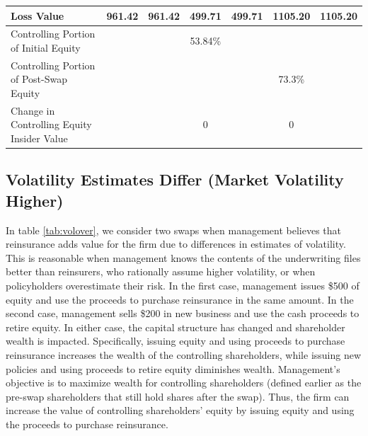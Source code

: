 \begin{table}
\begin{center}
\begin{tabular}{p{2in}cccccc}
Loss Value & 961.42 &   961.42 &   499.71 &   499.71 &   1105.20 &   1105.20 \\
\midrule

Controlling Portion of Initial Equity &            &            &   53.84\% &            &            &            \\

Controlling Portion of Post-Swap Equity &            &            &            &            &   73.3\% &            \\

\midrule
Change in Controlling Equity Insider Value &            &            &          0 &            &          0 &            \\
\bottomrule
\end{tabular}  
\end{center}
\end{table}

\subsection{Volatility Estimates Differ (Market Volatility Higher)}

In table \ref{tab:volover}, we consider two swaps when management believes that reinsurance adds value for the firm due to differences in estimates of volatility.  This is reasonable when management knows the contents of the underwriting files better than reinsurers, who rationally assume higher volatility, or when policyholders overestimate their risk. In the first case, management issues \$500 of equity and use the proceeds to purchase reinsurance in the same amount.  In the second case, management sells \$200 in new business and use the cash proceeds to retire equity.  In either case, the capital structure has changed and shareholder wealth is impacted.  Specifically, issuing equity and using proceeds to purchase reinsurance increases the wealth of the controlling shareholders, while issuing new policies and using proceeds to retire equity diminishes wealth. Management's objective is to maximize wealth for controlling shareholders (defined earlier as the pre-swap shareholders that still hold shares after the swap). Thus, the firm can increase the value of controlling shareholders' equity by issuing equity and using the proceeds to purchase reinsurance.

